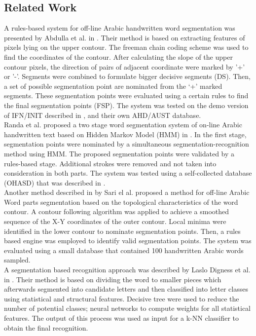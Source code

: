 \documentclass[journal,compsoc]{IEEEtran}
\begin{document}
\subsection{Related Work}
A rules-based system for off-line Arabic handwritten word segmentation was presented by Abdulla et al. in \cite{abdulla2008off}. Their method is based on extracting features of pixels lying on the upper contour. The freeman chain coding scheme was used to find the coordinates of the contour. After calculating the slope of the upper contour pixels, the direction of pairs of adjacent coordinate were marked by '+' or '-'. Segments were combined to formulate bigger decisive segments (DS). Then, a set of possible segmentation point are nominated from the ‘+’ marked segments. These segmentation points were evaluated using a certain rules to find the final segmentation points (FSP). The system was tested on the demo version of IFN/INIT described in \cite{pechwitz2002ifn} , and their own AHD/AUST database.\\

Randa et al. proposed a two stage word segmentation system of on-line Arabic handwritten text based on Hidden Markov Model (HMM) in \cite{elanwar2012unconstrained}. In the first stage, segmentation points were nominated by a simultaneous segmentation-recognition method using HMM. The proposed segmentation points were validated by a rules-based stage. Additional strokes were removed and not taken into consideration in both parts. The system was tested using a self-collected database (OHASD) that was described in \cite{elanwar2010ohasd}.\\

Another method described in \cite{sari2002off} by Sari el al. proposed a method for off-line Arabic Word parts segmentation based on the topological characteristics of the word contour. A contour following  algorithm was applied to achieve a smoothed sequence of the X-Y coordinates of the outer contour. Local minima were identified in the lower contour to nominate segmentation points. Then, a rules based engine was employed to identify valid segmentation points. The system was evaluated using a small database that contained 100 handwritten Arabic words sampled.\\

A segmentation based recognition approach was described by Laslo Digness et al. in \cite{Dinges2011}. Their method is based on dividing the word to smaller pieces which afterwards segmented into candidate letters and then classified into letter classes using statistical and structural features. Decisive tree were used to reduce the number of potential classes; neural networks to compute weights for all statistical features. The output of this process was used as input for a k-NN classifier to obtain the final recognition.\\
\end{document}
